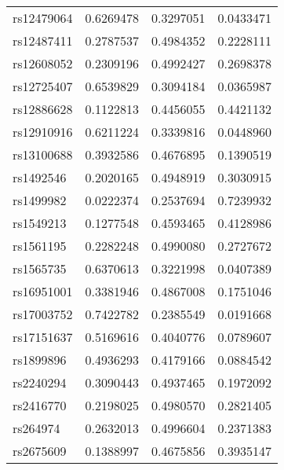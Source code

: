 \documentclass[
]{article}
\theoremstyle{plain}
\begin{document}
\begin{table}[H]
\begin{minipage}{0.5\linewidth}
\begin{table}[H]
\begin{tabular}{lrrr}
rs12479064 & 0.6269478 & 0.3297051 & 0.0433471\\
rs12487411 & 0.2787537 & 0.4984352 & 0.2228111\\
rs12608052 & 0.2309196 & 0.4992427 & 0.2698378\\
\addlinespace
rs12725407 & 0.6539829 & 0.3094184 & 0.0365987\\
rs12886628 & 0.1122813 & 0.4456055 & 0.4421132\\
rs12910916 & 0.6211224 & 0.3339816 & 0.0448960\\
rs13100688 & 0.3932586 & 0.4676895 & 0.1390519\\
rs1492546 & 0.2020165 & 0.4948919 & 0.3030915\\
\addlinespace
rs1499982 & 0.0222374 & 0.2537694 & 0.7239932\\
rs1549213 & 0.1277548 & 0.4593465 & 0.4128986\\
rs1561195 & 0.2282248 & 0.4990080 & 0.2727672\\
rs1565735 & 0.6370613 & 0.3221998 & 0.0407389\\
rs16951001 & 0.3381946 & 0.4867008 & 0.1751046\\
\addlinespace
rs17003752 & 0.7422782 & 0.2385549 & 0.0191668\\
rs17151637 & 0.5169616 & 0.4040776 & 0.0789607\\
rs1899896 & 0.4936293 & 0.4179166 & 0.0884542\\
rs2240294 & 0.3090443 & 0.4937465 & 0.1972092\\
rs2416770 & 0.2198025 & 0.4980570 & 0.2821405\\
\addlinespace
rs264974 & 0.2632013 & 0.4996604 & 0.2371383\\
rs2675609 & 0.1388997 & 0.4675856 & 0.3935147\\
\bottomrule
\end{tabular}
\end{table}



\end{minipage}
\end{table}
\end{document}
